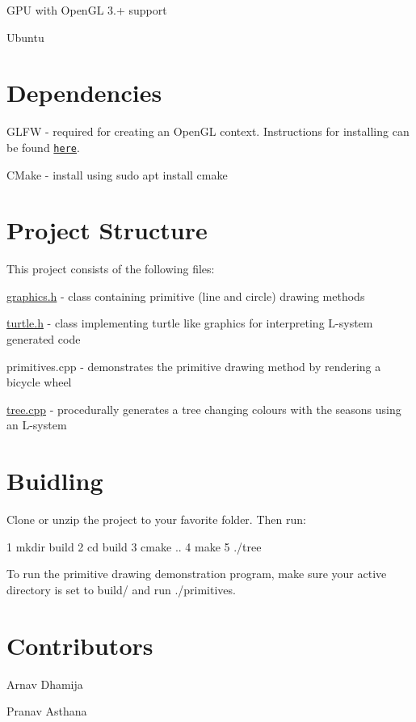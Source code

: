 \begin{DoxyItemize}
\item G\+PU with Open\+GL 3.+ support
\item Ubuntu
\end{DoxyItemize}

\section*{Dependencies}


\begin{DoxyItemize}
\item G\+L\+FW -\/ required for creating an Open\+GL context. Instructions for installing can be found \href{http://www.glfw.org/download.html}{\tt here}.
\item C\+Make -\/ install using {\ttfamily sudo apt install cmake}
\end{DoxyItemize}

\section*{Project Structure}

This project consists of the following files\+:


\begin{DoxyItemize}
\item {\ttfamily \hyperlink{graphics_8h_source}{graphics.\+h}} -\/ class containing primitive (line and circle) drawing methods
\item {\ttfamily \hyperlink{turtle_8h_source}{turtle.\+h}} -\/ class implementing turtle like graphics for interpreting L-\/system generated code
\item {\ttfamily primitives.\+cpp} -\/ demonstrates the primitive drawing method by rendering a bicycle wheel
\item {\ttfamily \hyperlink{tree_8cpp}{tree.\+cpp}} -\/ procedurally generates a tree changing colours with the seasons using an L-\/system
\end{DoxyItemize}

\section*{Buidling}

Clone or unzip the project to your favorite folder. Then run\+:


\begin{DoxyCode}
1 mkdir build
2 cd build
3 cmake ..
4 make
5 ./tree
\end{DoxyCode}


To run the primitive drawing demonstration program, make sure your active directory is set to {\ttfamily build/} and run {\ttfamily ./primitives}.

\section*{Contributors}


\begin{DoxyItemize}
\item Arnav Dhamija
\item Pranav Asthana 
\end{DoxyItemize}